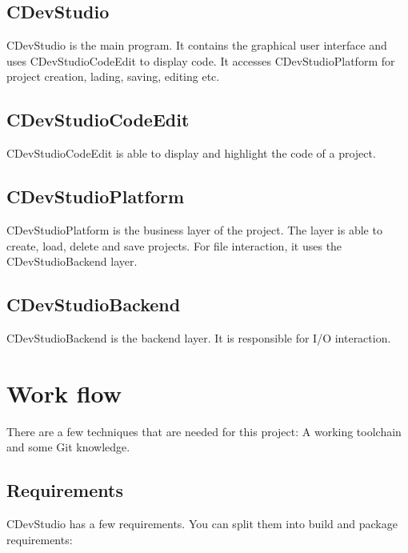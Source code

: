 \documentclass{article}
\begin{document}
\subsection{CDevStudio}
CDevStudio is the main program. It contains the graphical user interface and uses CDevStudioCodeEdit to display code. It accesses CDevStudioPlatform for project creation, lading, saving, editing etc.

\subsection{CDevStudioCodeEdit}
CDevStudioCodeEdit is able to display and highlight the code of a project.

\subsection{CDevStudioPlatform}
CDevStudioPlatform is the business layer of the project. The layer is able to create, load, delete and save projects. For file interaction, it uses the CDevStudioBackend layer.

\subsection{CDevStudioBackend}
CDevStudioBackend is the backend layer. It is responsible for I/O interaction.

\section{Work flow}
There are a few techniques that are needed for this project: A working toolchain and some Git knowledge.

\subsection{Requirements}
CDevStudio has a few requirements. You can split them into build and package requirements:
\end{document}
